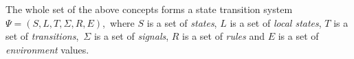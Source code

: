 The whole set of the above concepts forms a state transition system ${\Psi = (S, L, T, \Sigma, R, E)}$,\
where $S$ is a set of \textit{states}, $L$ is a set of \textit{local states}, $T$ is a set of \textit{transitions},\
$\Sigma$ is a set of \textit{signals}, $R$ is a set of \textit{rules} and $E$ is a set of \textit{environment} values.